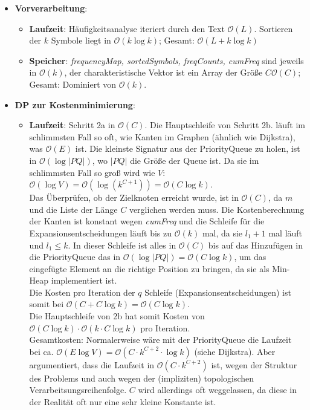 \documentclass[a4paper,10pt,ngerman]{scrartcl}
\begin{document}
\begin{itemize}
  \item \textbf{Vorverarbeitung}:
  \begin{itemize}
    \item \textbf{Laufzeit}:
      Häufigkeitsanalyse iteriert durch den Text $\mathcal{O}(L)$. Sortieren der $k$ Symbole liegt in $\mathcal{O}(k \log k)$; Gesamt: $\mathcal{O}(L + k \log k)$
    \item \textbf{Speicher}: \textit{frequencyMap, sortedSymbols, freqCounts, cumFreq} sind jeweils in $\mathcal{O}(k)$, der charakteristische Vektor ist ein Array der Größe $C \mathcal{O}(C)$; Gesamt: Dominiert von $\mathcal{O}(k)$.
  \end{itemize}
  \item \textbf{DP zur Kostenminimierung}:
  \begin{itemize}
    \item \textbf{Laufzeit}: Schritt 2a in $\mathcal{O}(C)$. Die Hauptschleife von Schritt 2b. läuft im schlimmsten Fall so oft, wie Kanten im Graphen (ähnlich wie Dijkstra), was $\mathcal{O}(E)$ ist. Die kleinste Signatur aus der PriorityQueue zu holen, ist in $\mathcal{O}(\log |PQ|)$, wo $|PQ|$ die Größe der Queue ist. Da sie im schlimmsten Fall so groß wird wie $V$: $\mathcal{O}(\log V) = \mathcal{O}(\log (k^{C+1})) = \mathcal{O}(C\log k)$.\\
    Das Überprüfen, ob der Zielknoten erreicht wurde, ist in $\mathcal{O}(C)$, da $m$ und die Liste der Länge $C$ verglichen werden muss. Die Kostenberechnung der Kanten ist konstant wegen \textit{cumFreq} und die Schleife für die Expansionsentscheidungen läuft bis zu $\mathcal{O}(k)$ mal, da sie $l_1 + 1$  mal läuft und $l_1 \le k$. In dieser Schleife ist alles in $\mathcal{O}(C)$ bis auf das Hinzufügen in die PriorityQueue das in $\mathcal{O}(\log |PQ|) = \mathcal{O}(C\log k)$, um das eingefügte Element an die richtige Position zu bringen, da sie als Min-Heap implementiert ist. \\
    Die Kosten pro Iteration der $q$ Schleife (Expansionsentscheidungen) ist somit bei $\mathcal{O}(C+ C\log k)=\mathcal{O}(C\log k)$.\\
    Die Hauptschleife von 2b hat somit Kosten von $\mathcal{O}(C\log k) \cdot \mathcal{O}(k \cdot C \log k)$ pro Iteration.\\
    Gesamtkosten: Normalerweise wäre mit der PriorityQueue die Laufzeit bei ca. $\mathcal{O}(E \log V) = \mathcal{O}(C\cdot k^{C+2}\cdot \log k)$ (siehe Dijkstra). Aber \cite[Richtung Ende Kapitel 4]{papergolinrote} argumentiert, dass die Laufzeit in $\mathcal{O}(C\cdot k^{C+2})$ ist, wegen der Struktur des Problems und auch wegen der (impliziten) topologischen Verarbeitsungsreihenfolge. $C$ wird allerdings oft weggelassen, da diese in der Realität oft nur eine sehr kleine Konstante ist.

\end{itemize}
\end{itemize}
\end{document}
